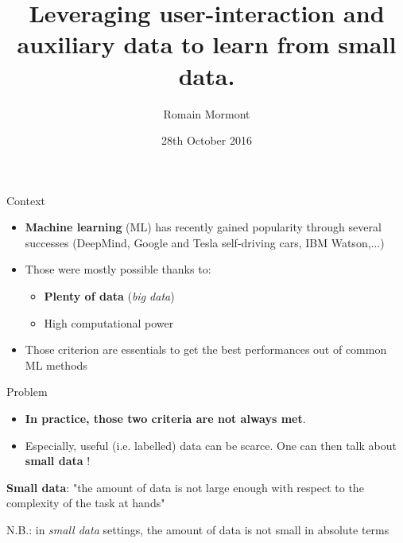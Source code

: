 \documentclass{beamer}
\title{{\bf Leveraging user-interaction and auxiliary data to learn from small data.}}
\author{Romain Mormont}
\institute{Systems and modeling unit, \\
Department of EE \& CS, \\ University of Liège, Belgium}
\date{28th October 2016}
\begin{document}
\renewcommand{\inserttotalframenumber}{12}


\begin{frame}
\titlepage
\end{frame}


\begin{frame}{Context}
	\begin{itemize}
		\item \textbf{Machine learning} (ML) has recently gained popularity through several successes (DeepMind, Google and Tesla self-driving cars, IBM Watson,...)
		\item Those were mostly possible thanks to: 
		\begin{itemize}
			\item \textbf{Plenty of data} (\textit{big data})
			\item High computational power
		\end{itemize}
		\item Those criterion are essentials to get the best performances out of common ML methods
	\end{itemize}
\end{frame}

\begin{frame}{Problem}
	\begin{itemize}
		\item \textbf{In practice, those two criteria are not always met}.
		\item Especially, useful (i.e. labelled) data can be scarce. One can then talk about \textbf{small data} ! 
	\end{itemize}
	\vfill
	\begin{center}
		\large
		\textbf{Small data}: "the amount of data is not large enough with respect to the complexity of the task at hands" 
	\end{center}
	\vfill
	\begin{center}
		\small
		N.B.: in \textit{small data} settings, the amount of data is not small in absolute terms 
	\end{center}
\end{frame}
\end{document}
